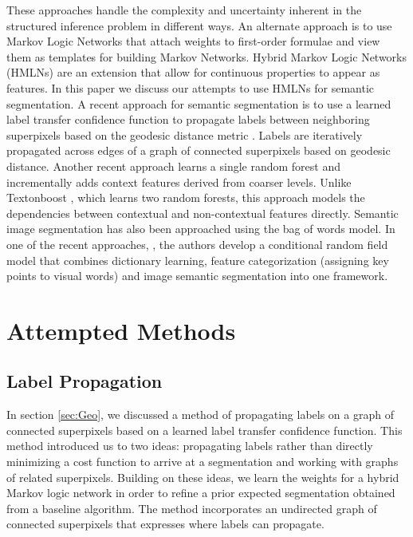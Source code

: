\documentclass{article} %
\begin{document}
These approaches handle the complexity and uncertainty inherent in the structured inference problem in different ways. An alternate approach is to use Markov Logic Networks \cite{Domingos06unifyinglogical} \cite{Richardson06markovlogic} that attach weights to first-order formulae and view them as templates for building Markov Networks. Hybrid Markov Logic Networks (HMLNs)\cite{Wang_hybridmarkov} are an extension that allow for continuous properties to appear as features. In this paper we discuss our attempts to use HMLNs for semantic segmentation. 
\label{sec:Geo}
A recent approach for semantic segmentation is to use a learned label transfer confidence function to propagate labels between neighboring superpixels based on the geodesic distance metric \cite{Chen2012}. Labels are iteratively propagated across edges of a graph of connected superpixels based on geodesic distance.
\label{sec:RandFor}
Another recent approach \cite{IterContFor12} learns a single random forest and incrementally adds context features derived from coarser levels. Unlike Textonboost \cite{Shotton06textonboost:joint}, which learns two random forests, this approach models the dependencies between contextual and non-contextual features directly. 
\label{sec:bagofwords}
Semantic image segmentation has also been approached using the bag of words model. In one of the recent approaches, \cite{visualdictrene}, the authors develop a conditional random field model that combines dictionary learning, feature categorization (assigning key points to visual words) and image semantic segmentation into one framework.

\section{Attempted Methods}
\label{sec:Attempt}
\subsection{Label Propagation}
\label{sec:AttemptLabProp}

	In section \ref{sec:Geo}, we discussed a method of propagating labels on a graph of connected superpixels based on a learned label transfer confidence function. This method introduced us to two ideas: propagating labels rather than directly minimizing a cost function to arrive at a segmentation and working with graphs of related superpixels. Building on these ideas, we learn the weights for a hybrid Markov logic network in order to refine a prior expected segmentation obtained from a baseline algorithm. The method incorporates an undirected graph of connected superpixels that expresses where labels can propagate.
\end{document}
